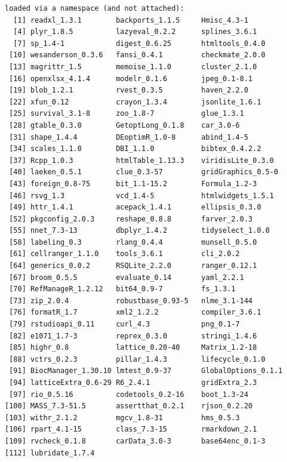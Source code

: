 \documentclass[11pt,]{article}
\begin{document}
\begin{verbatim}
loaded via a namespace (and not attached):
  [1] readxl_1.3.1        backports_1.1.5     Hmisc_4.3-1        
  [4] plyr_1.8.5          lazyeval_0.2.2      splines_3.6.1      
  [7] sp_1.4-1            digest_0.6.25       htmltools_0.4.0    
 [10] wesanderson_0.3.6   fansi_0.4.1         checkmate_2.0.0    
 [13] magrittr_1.5        memoise_1.1.0       cluster_2.1.0      
 [16] openxlsx_4.1.4      modelr_0.1.6        jpeg_0.1-8.1       
 [19] blob_1.2.1          rvest_0.3.5         haven_2.2.0        
 [22] xfun_0.12           crayon_1.3.4        jsonlite_1.6.1     
 [25] survival_3.1-8      zoo_1.8-7           glue_1.3.1         
 [28] gtable_0.3.0        GetoptLong_0.1.8    car_3.0-6          
 [31] shape_1.4.4         DEoptimR_1.0-8      abind_1.4-5        
 [34] scales_1.1.0        DBI_1.1.0           bibtex_0.4.2.2     
 [37] Rcpp_1.0.3          htmlTable_1.13.3    viridisLite_0.3.0  
 [40] laeken_0.5.1        clue_0.3-57         gridGraphics_0.5-0 
 [43] foreign_0.8-75      bit_1.1-15.2        Formula_1.2-3      
 [46] rsvg_1.3            vcd_1.4-5           htmlwidgets_1.5.1  
 [49] httr_1.4.1          acepack_1.4.1       ellipsis_0.3.0     
 [52] pkgconfig_2.0.3     reshape_0.8.8       farver_2.0.3       
 [55] nnet_7.3-13         dbplyr_1.4.2        tidyselect_1.0.0   
 [58] labeling_0.3        rlang_0.4.4         munsell_0.5.0      
 [61] cellranger_1.1.0    tools_3.6.1         cli_2.0.2          
 [64] generics_0.0.2      RSQLite_2.2.0       ranger_0.12.1      
 [67] broom_0.5.5         evaluate_0.14       yaml_2.2.1         
 [70] RefManageR_1.2.12   bit64_0.9-7         fs_1.3.1           
 [73] zip_2.0.4           robustbase_0.93-5   nlme_3.1-144       
 [76] formatR_1.7         xml2_1.2.2          compiler_3.6.1     
 [79] rstudioapi_0.11     curl_4.3            png_0.1-7          
 [82] e1071_1.7-3         reprex_0.3.0        stringi_1.4.6      
 [85] highr_0.8           lattice_0.20-40     Matrix_1.2-18      
 [88] vctrs_0.2.3         pillar_1.4.3        lifecycle_0.1.0    
 [91] BiocManager_1.30.10 lmtest_0.9-37       GlobalOptions_0.1.1
 [94] latticeExtra_0.6-29 R6_2.4.1            gridExtra_2.3      
 [97] rio_0.5.16          codetools_0.2-16    boot_1.3-24        
[100] MASS_7.3-51.5       assertthat_0.2.1    rjson_0.2.20       
[103] withr_2.1.2         mgcv_1.8-31         hms_0.5.3          
[106] rpart_4.1-15        class_7.3-15        rmarkdown_2.1      
[109] rvcheck_0.1.8       carData_3.0-3       base64enc_0.1-3    
[112] lubridate_1.7.4    
\end{verbatim}
\end{document}
